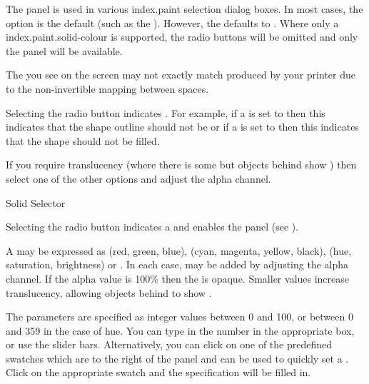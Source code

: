 The  panel is used in various \gls{index.paint}
selection dialog boxes.
In most cases, the  option is the default
(such as the ).  However, the
 defaults to .
Where only a \gls{index.paint.solid-colour} is supported, the radio
buttons will be omitted and only the  panel
will be available.

\begin{warning}
The  you see on the screen may not exactly match
 produced by your printer due to the non-invertible
mapping between  spaces.
\end{warning}


Selecting the  radio button indicates
. For example, if a  is set to
 then this indicates that the \gls{shape}
outline should not be  or if a
 is set to  then
this indicates that the \gls{shape} should not be filled.

If you require \gls{translucency} (where there is some 
but \glspl{object} behind show ) then select one of
the other  options and adjust the alpha channel.


{}
{Solid  Selector}

Selecting the  radio button indicates a
  and enables the
 panel (see ). 

A  may be expressed as
 (red, green, blue),
 (cyan, magenta, yellow, black),
 (hue, saturation, brightness) or
. In each case,
 may be added by adjusting
the alpha channel.  If the alpha value is 100\% then the
 is opaque.  Smaller values increase
\gls{translucency}, allowing \glspl{object} behind to show
.

The parameters are specified as integer values between 0 and 100,
or between 0 and 359 in the case of hue.
You can type in the number in the appropriate box, or use
the slider bars. Alternatively, you can click on one of the predefined swatches
which are to the right of the  panel 
and can be used to quickly set a . Click on the 
appropriate swatch and the  specification will be
filled in.

